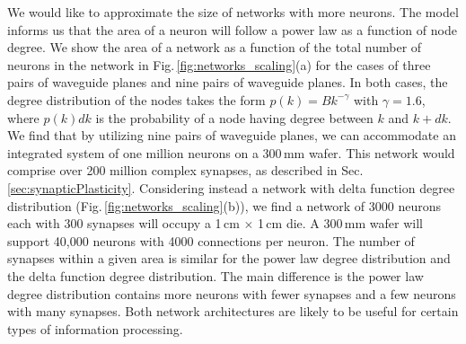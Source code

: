 \documentclass[twocolumn]{article}
\begin{document}
We would like to approximate the size of networks with more neurons. The model informs us that the area of a neuron will follow a power law as a function of node degree. We show the area of a network as a function of the total number of neurons in the network in Fig.\,\ref{fig:networks_scaling}(a) for the cases of three pairs of waveguide planes and nine pairs of waveguide planes. In both cases, the degree distribution of the nodes takes the form $p(k) = Bk^{-\gamma}$ with $\gamma = 1.6$, where $p(k)dk$ is the probability of a node having degree between $k$ and $k+dk$. We find that by utilizing nine pairs of waveguide planes, we can accommodate an integrated system of one million neurons on a 300\,mm wafer. This network would comprise over 200 million complex synapses, as described in Sec.\,\ref{sec:synapticPlasticity}. Considering instead a network with delta function degree distribution (Fig.\,\ref{fig:networks_scaling}(b)), we find a network of 3000 neurons each with 300 synapses will occupy a 1\,cm $\times$ 1\,cm die. A 300\,mm wafer will support 40,000 neurons with 4000 connections per neuron. The number of synapses within a given area is similar for the power law degree distribution and the delta function degree distribution. The main difference is the power law degree distribution contains more neurons with fewer synapses and a few neurons with many synapses. Both network architectures are likely to be useful for certain types of information processing.
\end{document}

